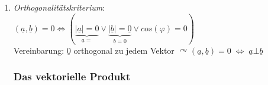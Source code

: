 \begin{enumerate}
\begin{enumerate} [label=\alph*.)]
$\varphi=arccos\left(\frac{29}{\sqrt{14} \cdot \sqrt{65}}\right)\approx 15,92^{\circ}$
\item Projektion von $\underline{b}$ auf $\underline{a}$: $\underline{b}\underline{a}=\frac{(\underline{a}, \underline{b})}{|\underline{a}|^2}\underline{a}=\frac{29}{14}\begin{pmatrix}
1\\
-2\\
3
\end{pmatrix}=\frac{29}{14}\underline{e}_1-\frac{29}{7}\underline{e}_2+\frac{29\cdot 3}{14} \underline{e}_3$
\end{enumerate}
\item \emph{Orthogonalitätskriterium}:\\
$(\underline{a}, \underline{b})=0 \Leftrightarrow (\underbrace{|\underline{a}|=0}_{\underline{a}=} \vee \underbrace{|\underline{b}|=\underline{0}}_{\underline{b}=\underline{0}} \vee cos(\varphi)=0)$\\
Vereinbarung: $\underline{0}$ orthogonal zu jedem Vektor
$\curvearrowright \boxed{(\underline{a}, \underline{b})=0 \;\Leftrightarrow\; \underline{a} \bot \underline{b}}$

\subsubsection{Das vektorielle Produkt}

\end{enumerate}
